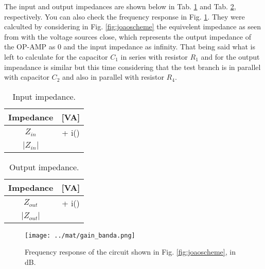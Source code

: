 The input and output impedances are shown below in Tab. \ref{tab:octinput} and Tab. \ref{tab:octoutput}, respectively. You can also check the frequency response in Fig. \ref{fig:octavefreq}. They were calculted by considering in Fig. \ref{fig:joaoscheme} the equivelent impedance as seen from with the voltage sources close, which represents the output impedance of the OP-AMP as 0 and the input impedance as infinity. That being said what is left to calculate for the capacitor $C_{1}$ in series with resistor $R_{1}$ and for the output impeadance is similar but this time considering that the test branch is in parallel with capacitor $C_{2}$ and also in parallel with resistor $R_{4}$.

\begin{table}[H]
    \centering
    \begin{tabular}{|c|c|}
    	\hline
        Impedance &  [VA]\\ 
        \hline
        $Z_{in}$ &  + i()\\ \hline
        $|Z_{in}|$ & \\ \hline
    \end{tabular}
    \caption{Input impedance.}
    \label{tab:octinput}
\end{table}

\begin{table}[H]
    \centering
    \begin{tabular}{|c|c|}
    	\hline
        Impedance &  [VA]\\ 
        \hline
        $Z_{out}$ &  + i()\\ \hline
        $|Z_{out}|$ & \\ \hline
    \end{tabular}
    \caption{Output impedance.}
    \label{tab:octoutput}
\end{table}

\begin{figure}[H]
    \centering
    \texttt{[image: ../mat/gain\_banda.png]}
    \caption{Frequency response of the circuit shown in Fig. \ref{fig:joaoscheme}, in dB.}
    \label{fig:octavefreq}
\end{figure}